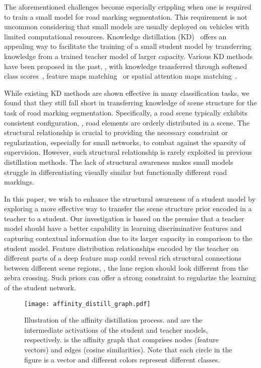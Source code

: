 \documentclass[10pt,twocolumn,letterpaper]{article}
\begin{document}
The aforementioned challenges become especially crippling when one is required to train a small model for road marking segmentation. This requirement is not uncommon considering that small models are usually deployed on vehicles with limited computational resources.
Knowledge distillation (KD)~\cite{hinton2015distilling} offers an appealing way to facilitate the training of a small student model by transferring knowledge from a trained teacher model of larger capacity.
Various KD methods have been proposed in the past, \eg, with knowledge transferred through softened class scores~\cite{hinton2015distilling}, feature maps matching~\cite{hou2019learningto,liu2019structured} or spatial attention maps matching~\cite{zagoruyko2016paying}.


While existing KD methods are shown effective in many classification tasks, we found that they still fall short in transferring knowledge of scene structure for the task of road marking segmentation. 
Specifically, a road scene typically exhibits consistent configuration, \ie, road elements are orderly distributed in a scene. The structural relationship is crucial to providing the necessary constraint or regularization, especially for small networks, to combat against the sparsity of supervision. However, such structural relationship is rarely exploited in previous distillation methods.
The lack of structural awareness makes small models struggle in differentiating visually similar but functionally different road markings.


In this paper, we wish to enhance the structural awareness of a student model by exploring a more effective way to transfer the scene structure prior encoded in a teacher to a student.
Our investigation is based on the premise that a teacher model should have a better capability in learning discriminative features and capturing contextual information due to its larger capacity in comparison to the student model. Feature distribution relationships encoded by the teacher on different parts of a deep feature map could reveal rich structural connections between different scene regions, \eg, the lane region should look different from the zebra crossing. Such priors can offer a strong constraint to regularize the learning of the student network.

\begin{figure}[t]
 \centering
 \texttt{[image: affinity\_distill\_graph.pdf]}
 \vskip -0.2cm
 \caption{Illustration of the affinity distillation process.  and  are the intermediate activations of the student and teacher models, respectively.  is the affinity graph that comprises nodes (feature vectors) and edges (cosine similarities). Note that each circle in the figure is a vector and different colors represent different classes.}
 \centering
 \vskip -0.4cm
 \label{fig:graph_map}
\end{figure}
\end{document}
